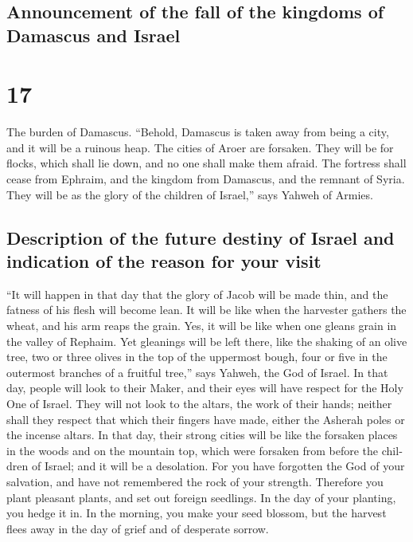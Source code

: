 \begin{paracol}{2}
\switchcolumn
\begin{otherlanguage}{english}

\hypertarget{announcement-of-the-fall-of-the-kingdoms-of-damascus-and-israel}{%
\subsection{Announcement of the fall of the kingdoms of Damascus and
Israel}\label{announcement-of-the-fall-of-the-kingdoms-of-damascus-and-israel}}

\hypertarget{section-33}{%
\section{17}\label{section-33}}

 The burden of Damascus. ``Behold, Damascus is taken away
from being a city, and it will be a ruinous heap.  The
cities of Aroer are forsaken. They will be for flocks, which shall lie
down, and no one shall make them afraid.  The fortress
shall cease from Ephraim, and the kingdom from Damascus, and the remnant
of Syria. They will be as the glory of the children of Israel,'' says
Yahweh of Armies.

\hypertarget{description-of-the-future-destiny-of-israel-and-indication-of-the-reason-for-your-visit}{%
\subsection{Description of the future destiny of Israel and indication
of the reason for your
visit}\label{description-of-the-future-destiny-of-israel-and-indication-of-the-reason-for-your-visit}}

 ``It will happen in that day that the glory of Jacob will
be made thin, and the fatness of his flesh will become lean.
 It will be like when the harvester gathers the wheat, and
his arm reaps the grain. Yes, it will be like when one gleans grain in
the valley of Rephaim.  Yet gleanings will be left there,
like the shaking of an olive tree, two or three olives in the top of the
uppermost bough, four or five in the outermost branches of a fruitful
tree,'' says Yahweh, the God of Israel.  In that day,
people will look to their Maker, and their eyes will have respect for
the Holy One of Israel.  They will not look to the altars,
the work of their hands; neither shall they respect that which their
fingers have made, either the Asherah poles or the incense altars.
 In that day, their strong cities will be like the
forsaken places in the woods and on the mountain top, which were
forsaken from before the children of Israel; and it will be a
desolation.  For you have forgotten the God of your
salvation, and have not remembered the rock of your strength. Therefore
you plant pleasant plants, and set out foreign seedlings.
 In the day of your planting, you hedge it in. In the
morning, you make your seed blossom, but the harvest flees away in the
day of grief and of desperate sorrow.


\end{otherlanguage}
\end{paracol}
